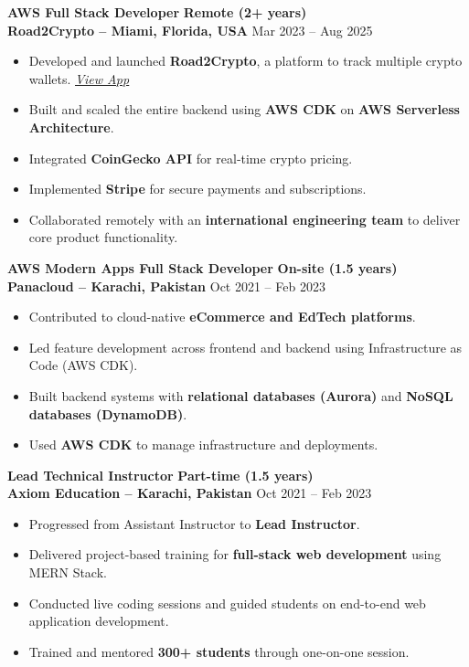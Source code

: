 \documentclass[a4paper,12pt]{article}
\begin{document}
\textbf{AWS Full Stack Developer} \hfill \textbf{Remote (2+ years)} \\
\textbf{Road2Crypto – Miami, Florida, USA} \hfill Mar 2023 -- Aug 2025
\begin{itemize}
    \item Developed and launched \textbf{Road2Crypto}, a platform to track multiple crypto wallets.
    \hfill \textit{\href{https://road2crypto.com/assets?address=0x5d1d84d7d03016c505720e05f689cc49d77ebcb2}{\underline{View App}}} 
    \item Built and scaled the entire backend using \textbf{AWS CDK} on \textbf{AWS Serverless Architecture}.
    \item Integrated \textbf{CoinGecko API} for real‑time crypto pricing.
    \item Implemented \textbf{Stripe} for secure payments and subscriptions.
    \item Collaborated remotely with an \textbf{international engineering team} to deliver core product functionality.
\end{itemize}

\textbf{AWS Modern Apps Full Stack Developer} \hfill \textbf{On-site (1.5 years)} \\
\textbf{Panacloud – Karachi, Pakistan} \hfill Oct 2021 -- Feb 2023
\begin{itemize}
    \item Contributed to cloud-native \textbf{eCommerce and EdTech platforms}.
    \item Led feature development across frontend and backend using Infrastructure as Code (AWS CDK).
    \item Built backend systems with \textbf{relational databases (Aurora)} and \textbf{NoSQL databases (DynamoDB)}.
    \item Used \textbf{AWS CDK} to manage infrastructure and deployments.
\end{itemize}

\textbf{Lead Technical Instructor} \hfill \textbf{Part-time (1.5 years)} \\
\textbf{Axiom Education – Karachi, Pakistan} \hfill Oct 2021 -- Feb 2023
\begin{itemize}
    \item Progressed from Assistant Instructor to \textbf{Lead Instructor}.
    \item Delivered project-based training for \textbf{full-stack web development} using MERN Stack.
    \item Conducted live coding sessions and guided students on end-to-end web application development.
    \item Trained and mentored \textbf{300+ students} through one-on-one session.
\end{itemize}
\end{document}
